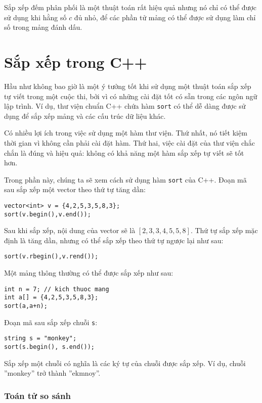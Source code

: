 Sắp xếp đếm phân phối là một thuật toán rất hiệu quả
nhưng nó chỉ có thể được sử dụng khi hằng số $c$
đủ nhỏ, để các phần tử mảng có thể
được sử dụng làm chỉ số trong mảng đánh dấu.

\section{Sắp xếp trong C++}


Hầu như không bao giờ là một ý tưởng tốt khi sử dụng
một thuật toán sắp xếp tự viết
trong một cuộc thi, bởi vì có những
cài đặt tốt có sẵn trong các ngôn ngữ lập trình.
Ví dụ, thư viện chuẩn C++ chứa
hàm \texttt{sort} có thể dễ dàng được sử dụng để
sắp xếp mảng và các cấu trúc dữ liệu khác.

Có nhiều lợi ích trong việc sử dụng một hàm thư viện.
Thứ nhất, nó tiết kiệm thời gian vì không cần phải
cài đặt hàm.
Thứ hai, việc cài đặt của thư viện
chắc chắn là đúng và hiệu quả: không có khả năng
một hàm sắp xếp tự viết sẽ tốt hơn.

Trong phần này, chúng ta sẽ xem cách sử dụng
hàm \texttt{sort} của C++.
Đoạn mã sau sắp xếp
một vector theo thứ tự tăng dần:
\begin{lstlisting}
vector<int> v = {4,2,5,3,5,8,3};
sort(v.begin(),v.end());
\end{lstlisting}
Sau khi sắp xếp, nội dung của
vector sẽ là
$[2,3,3,4,5,5,8]$.
Thứ tự sắp xếp mặc định là tăng dần,
nhưng có thể sắp xếp theo thứ tự ngược lại như sau:
\begin{lstlisting}
sort(v.rbegin(),v.rend());
\end{lstlisting}
Một mảng thông thường có thể được sắp xếp như sau:
\begin{lstlisting}
int n = 7; // kich thuoc mang
int a[] = {4,2,5,3,5,8,3};
sort(a,a+n);
\end{lstlisting}
\newpage
Đoạn mã sau sắp xếp chuỗi \texttt{s}:
\begin{lstlisting}
string s = "monkey";
sort(s.begin(), s.end());
\end{lstlisting}
Sắp xếp một chuỗi có nghĩa là các ký tự
của chuỗi được sắp xếp.
Ví dụ, chuỗi ''monkey'' trở thành ''ekmnoy''.

\subsubsection{Toán tử so sánh}


